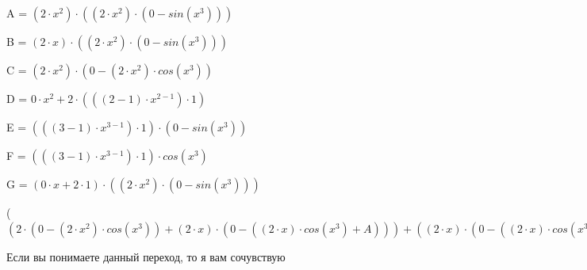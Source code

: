 \documentclass[12pt,a4paper,fleqn]{article}
\begin{document}
\begin{center}
A = $(2 \cdot x^{2}) \cdot ((2 \cdot x^{2}) \cdot (0-sin(x^{3})))$\end{center}
\begin{center}
B = $(2 \cdot x) \cdot ((2 \cdot x^{2}) \cdot (0-sin(x^{3})))$\end{center}
\begin{center}
C = $(2 \cdot x^{2}) \cdot (0-(2 \cdot x^{2}) \cdot cos(x^{3}))$\end{center}
\begin{center}
D = $0 \cdot x^{2}+2 \cdot (((2-1) \cdot x^{2-1}) \cdot 1)$\end{center}
\begin{center}
E = $(((3-1) \cdot x^{3-1}) \cdot 1) \cdot (0-sin(x^{3}))$\end{center}
\begin{center}
F = $(((3-1) \cdot x^{3-1}) \cdot 1) \cdot cos(x^{3})$\end{center}
\begin{center}
G = $(0 \cdot x+2 \cdot 1) \cdot ((2 \cdot x^{2}) \cdot (0-sin(x^{3})))$\end{center}
\begin{center}
 ($(2 \cdot (0-(2 \cdot x^{2}) \cdot cos(x^{3}))+(2 \cdot x) \cdot (0-((2 \cdot x) \cdot cos(x^{3})+A)))+((2 \cdot x) \cdot (0-((2 \cdot x) \cdot cos(x^{3})+A))+(2 \cdot x^{2}) \cdot (0-((2 \cdot cos(x^{3})+B)+(B+(2 \cdot x^{2}) \cdot ((2 \cdot x) \cdot (0-sin(x^{3}))+C))))))'
  = ((0 \cdot (0-(2 \cdot x^{2}) \cdot cos(x^{3}))+2 \cdot (0-((D) \cdot cos(x^{3})+(2 \cdot x^{2}) \cdot (E))))+((0 \cdot x+2 \cdot 1) \cdot (0-((2 \cdot x) \cdot cos(x^{3})+A))+(2 \cdot x) \cdot (0-(((0 \cdot x+2 \cdot 1) \cdot cos(x^{3})+(2 \cdot x) \cdot (E))+((D) \cdot ((2 \cdot x^{2}) \cdot (0-sin(x^{3})))+(2 \cdot x^{2}) \cdot ((D) \cdot (0-sin(x^{3}))+(2 \cdot x^{2}) \cdot (0-F)))))))+(((0 \cdot x+2 \cdot 1) \cdot (0-((2 \cdot x) \cdot cos(x^{3})+A))+(2 \cdot x) \cdot (0-(((0 \cdot x+2 \cdot 1) \cdot cos(x^{3})+(2 \cdot x) \cdot (E))+((D) \cdot ((2 \cdot x^{2}) \cdot (0-sin(x^{3})))+(2 \cdot x^{2}) \cdot ((D) \cdot (0-sin(x^{3}))+(2 \cdot x^{2}) \cdot (0-F))))))+((D) \cdot (0-((2 \cdot cos(x^{3})+B)+(B+(2 \cdot x^{2}) \cdot ((2 \cdot x) \cdot (0-sin(x^{3}))+C))))+(2 \cdot x^{2}) \cdot (0-(((0 \cdot cos(x^{3})+2 \cdot (E))+(G+(2 \cdot x) \cdot ((D) \cdot (0-sin(x^{3}))+(2 \cdot x^{2}) \cdot (0-F))))+((G+(2 \cdot x) \cdot ((D) \cdot (0-sin(x^{3}))+(2 \cdot x^{2}) \cdot (0-F)))+((D) \cdot ((2 \cdot x) \cdot (0-sin(x^{3}))+C)+(2 \cdot x^{2}) \cdot (((0 \cdot x+2 \cdot 1) \cdot (0-sin(x^{3}))+(2 \cdot x) \cdot (0-F))+((D) \cdot (0-(2 \cdot x^{2}) \cdot cos(x^{3}))+(2 \cdot x^{2}) \cdot (0-((D) \cdot cos(x^{3})+(2 \cdot x^{2}) \cdot (E)))))))))))$\end{center}
Если вы понимаете данный переход, то я вам сочувствую
\end{document}
